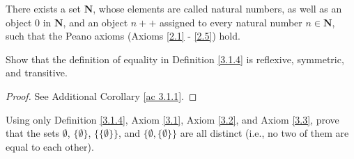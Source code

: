 \begin{axiom}[Infinity]\label{3.7}
There exists a set \(\mathbf{N}\), whose elements are called natural numbers, as well as an object \(0\) in \(\mathbf{N}\), and an object \(n++\) assigned to every natural number \(n \in \mathbf{N}\), such that the Peano axioms (Axioms \ref{2.1} - \ref{2.5}) hold.
\end{axiom}

\exercisesection

\begin{exercise}\label{ex 3.1.1}
Show that the definition of equality in Definition \ref{3.1.4} is reflexive, symmetric, and transitive.
\end{exercise}

\begin{proof}
See Additional Corollary \ref{ac 3.1.1}.
\end{proof}

\begin{exercise}\label{ex 3.1.2}
Using only Definition \ref{3.1.4}, Axiom \ref{3.1}, Axiom \ref{3.2}, and Axiom \ref{3.3}, prove that the sets \(\emptyset\), \(\{\emptyset\}\), \(\{\{\emptyset\}\}\), and \(\{\emptyset, \{\emptyset\}\}\) are all distinct
(i.e., no two of them are equal to each other).
\end{exercise}

